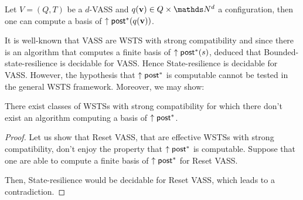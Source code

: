 \begin{proposition}\cite{DBLP:journals/corr/abs-2108-00889}
Let $V= (Q,T)$ be a $d$-VASS and $q(\textbf{v}) \in Q \times \N^d$ a configuration, then one can compute a basis of $\uparrow \textsf{post}^*(q(\textbf{v}))$.
\end{proposition}


\fi
It is well-known that 
VASS are WSTS with strong compatibility and since there is an algorithm that computes a finite basis of  $\uparrow \textsf{post}^*(s)$, \cite{DBLP:conf/gg/Ozkan22} deduced that {\sc Bounded-state-resilience} is decidable for VASS.
Hence {\sc State-resilience} is decidable for %
VASS.
However, the hypothesis that $\uparrow \textsf{post}^*$ is computable cannot be tested in the general WSTS framework. Moreover, we may show:

\begin{proposition}
There exist classes of WSTSs with strong 
 compatibility for which there don't exist an algorithm computing a basis of $\uparrow \textsf{post}^*$.
\end{proposition}


\begin{proof}
Let us show that Reset VASS, that are effective WSTSs with strong compatibility, don't enjoy the property that $\uparrow \textsf{post}^*$ is computable.
Suppose that one are able to compute a finite basis of $\uparrow \textsf{post}^*$ for Reset VASS. 
\iffalse
Then, one would be able to decide whether an element $m \in \min(\uparrow \post^*)$ is reachable.
by examining if there is %
$0$ in the basis%
. But reachability of $0$  %
is undecidable for Reset VASS. 
\fi
Then, {\sc State-resilience} would be decidable for Reset VASS, which leads to a contradiction.
\end{proof}



%
%
%











